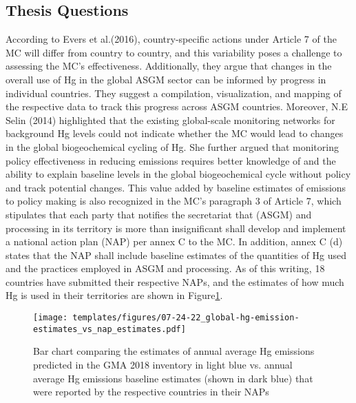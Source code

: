 \begin{flushleft}


\section{Thesis Questions}
According to Evers et al.(2016), country-specific actions under Article 7 of the MC will differ from country to country, and this variability poses a challenge to assessing the MC's effectiveness. Additionally, they argue that changes in the overall use of Hg in the global ASGM sector can be informed by progress in individual countries. They suggest a compilation, visualization, and mapping of the respective data to track this progress across ASGM countries. Moreover, N.E Selin (2014) highlighted that the existing global-scale monitoring networks for background Hg levels could not indicate whether the MC would lead to changes in the global biogeochemical cycling of Hg. She further argued that monitoring policy effectiveness in reducing emissions requires better knowledge of and the ability to explain baseline levels in the global biogeochemical cycle without policy and track potential changes. This value added by baseline estimates of emissions to policy making is also recognized in the MC's paragraph 3 of Article 7, which stipulates that each party that notifies the secretariat that (ASGM) and processing in its territory is more than insignificant shall develop and implement a national action plan (NAP) per annex C to the MC. In addition, annex C (d) states that the NAP shall include baseline estimates of the quantities of Hg used and the practices employed in ASGM and processing. As of this writing, 18 countries have submitted their respective NAPs, and the estimates of how much Hg is used in their territories are shown in Figure\ref{fig:global-hg-emission-estimates_vs_nap_estimates}. 

\begin{figure}[H]
  \texttt{[image: templates/figures/07-24-22\_global-hg-emission-estimates\_vs\_nap\_estimates.pdf]}
  \centering
  \caption{Bar chart comparing the estimates of annual average Hg emissions predicted in the GMA 2018 inventory in light blue vs. annual average Hg emissions baseline estimates (shown in dark blue) that were reported by the respective countries in their NAPs \cite{united_nations_environment_programme_technical_2019} }
  \label{fig:global-hg-emission-estimates_vs_nap_estimates}
\end{figure}
\FloatBarrier



\end{flushleft}
